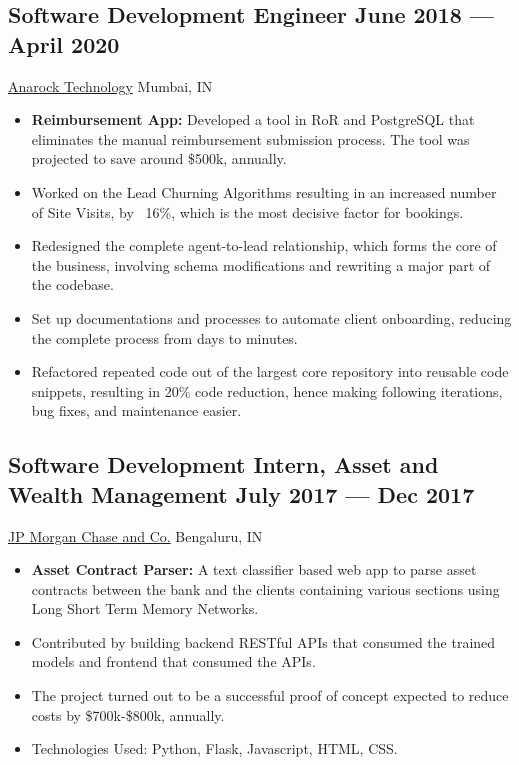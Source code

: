 \documentclass[a4,10pt]{article}
\newcommand{\subtext}[1]{
#1\par\vspace{-0.2cm}}
\newenvironment{zitemize}{
\begin{itemize}\itemsep0pt \parskip0pt \parsep1pt}
{\end{itemize}\vspace{-0.5cm}}
\begin{document}
\subsection*{Software Development Engineer \hfill June 2018 --- April 2020} 
\subtext{\href{https://tech.anarock.com/}{Anarock Technology} \hfill Mumbai, IN} 
    \begin{zitemize}
        \item {\bf Reimbursement App: } Developed a tool in RoR and PostgreSQL that eliminates the manual reimbursement submission process. The tool was projected to save around \$500k, annually.
        \item Worked on the Lead Churning Algorithms resulting in an increased number of Site Visits, by ~16\%, which is the most decisive factor for bookings.
        \item Redesigned the complete agent-to-lead relationship, which forms the core of the business, involving schema modifications and rewriting a major part of the codebase.
        \item Set up documentations and processes to automate client onboarding, reducing the complete process from days to minutes.
        \item Refactored repeated code out of the largest core repository into reusable code snippets, resulting in 20\% code reduction, hence making following iterations, bug fixes, and maintenance easier.
    \end{zitemize}        

\subsection*{Software Development Intern, Asset and Wealth Management \hfill July 2017 --- Dec 2017} 
\subtext{\href{https://www.jpmorganchase.com/}{JP Morgan Chase and Co.} \hfill Bengaluru, IN} 
    \begin{zitemize}
        \item {\bf Asset Contract Parser: }A text classifier based web app to parse asset contracts between the bank and the clients containing various sections using Long Short Term Memory Networks.
        \item Contributed by building backend RESTful APIs that consumed the trained models and frontend that consumed the APIs.
        \item The project turned out to be a successful proof of concept expected to reduce costs by \$700k-\$800k, annually.
        \item Technologies Used: Python, Flask, Javascript, HTML, CSS.
    \end{zitemize}
\end{document}
